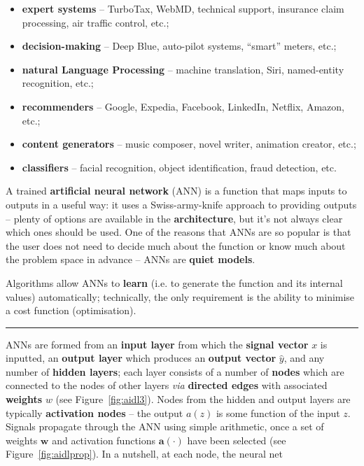 \begin{itemize}[noitemsep]
\item \textbf{expert systems} -- TurboTax, WebMD, technical support, insurance claim processing, air traffic control, etc.;
\item \textbf{decision-making} -- Deep Blue, auto-pilot systems, ``smart'' meters, etc.;
\item \textbf{natural Language Processing} -- machine translation, Siri, named-entity recognition, etc.;
\item \textbf{recommenders} -- Google, Expedia, Facebook, LinkedIn, Netflix, Amazon, etc.;
\item \textbf{content generators} -- music composer, novel writer, animation creator, etc.;
\item \textbf{classifiers} -- facial recognition, object identification, fraud detection, etc.
\end{itemize}
A trained \textbf{artificial neural network} (ANN) is a function that maps inputs to outputs in a useful way: it uses a Swiss-army-knife approach to providing outputs -- plenty of options are available in the \textbf{architecture}, but it's not always clear which ones should be used. One of the reasons that ANNs are so popular is that the user does not need to decide much about the function or know much about the problem space in advance -- ANNs are \textbf{quiet models}.\par Algorithms allow ANNs to \textbf{learn} (i.e. to generate the function and its internal values) automatically; technically, the only requirement is the ability to minimise a cost function (optimisation).
\begin{center}\rule{0.5\linewidth}{.4pt}\end{center}
ANNs are formed from an \textbf{input layer} from which the \textbf{signal vector} $x$ is inputted, an \textbf{output layer} which produces an \textbf{output vector} $\hat{y}$, and any number of \textbf{hidden layers}; each layer consists of a number of \textbf{nodes} which are connected to the nodes of other layers \textit{via} \textbf{directed edges} with associated \textbf{weights} $w$ (see Figure~\ref{fig:aidl3}). Nodes from the hidden and output layers are typically \textbf{activation nodes} -- the output $a(z)$ is some function of the input $z$. Signals propagate through the ANN using simple arithmetic, once a set of weights $\mathbf{w}$ and activation functions $\mathbf{a(\cdot)}$ have been selected (see Figure~\ref{fig:aidlprop}). In a nutshell, at each node, the neural net
